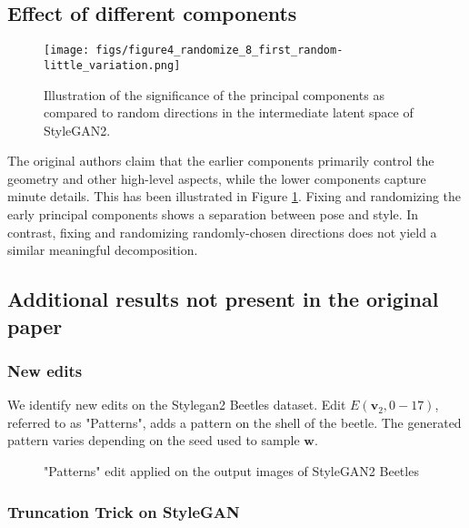 \subsection{Effect of different components}

\begin{figure}[H]
    \centering
    \texttt{[image: figs/figure4\_randomize\_8\_first\_random-little\_variation.png]}
    \caption{Illustration of the significance of the principal components as compared to random directions in the intermediate latent space of StyleGAN2.}
    \label{fig:cats}
\end{figure}

The original authors claim that the earlier components primarily control the geometry and other high-level aspects, while the lower components capture minute details. This has been illustrated in Figure \ref{fig:cats}. Fixing and randomizing the early principal components shows a separation between pose and style. In contrast, fixing and randomizing randomly-chosen directions does not yield a similar meaningful decomposition.

\subsection{Additional results not present in the original paper}

\subsubsection{New edits}

We identify new edits on the Stylegan2 Beetles dataset. Edit $E(\textbf{v}_{2}, 0-17)$, referred to as "Patterns", adds a pattern on the shell of the beetle. The generated pattern varies depending on the seed used to sample $\textbf{w}$.

\begin{figure}[H]



\caption{"Patterns" edit applied on the output images of StyleGAN2 Beetles}

\end{figure}

\subsubsection{Truncation Trick on StyleGAN}


